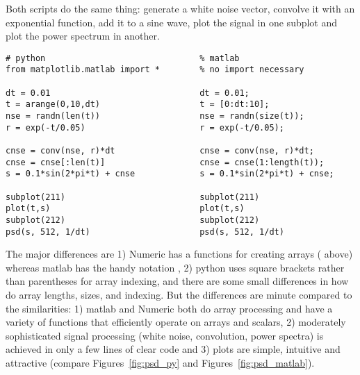 \documentclass[twoside]{book}
\begin{document}

Both scripts do the same thing: generate a white noise vector,
convolve it with an exponential function, add it to a sine wave, plot
the signal in one subplot and plot the power spectrum in another.

\begin{lstlisting}[caption={matplotlib and matlab}, label=lst:versus_matlab]
# python                               % matlab
from matplotlib.matlab import *        % no import necessary

dt = 0.01                              dt = 0.01;
t = arange(0,10,dt)                    t = [0:dt:10];
nse = randn(len(t))                    nse = randn(size(t));
r = exp(-t/0.05)                       r = exp(-t/0.05);

cnse = conv(nse, r)*dt                 cnse = conv(nse, r)*dt;
cnse = cnse[:len(t)]                   cnse = cnse(1:length(t));
s = 0.1*sin(2*pi*t) + cnse             s = 0.1*sin(2*pi*t) + cnse;

subplot(211)                           subplot(211)
plot(t,s)                              plot(t,s)
subplot(212)                           subplot(212)
psd(s, 512, 1/dt)                      psd(s, 512, 1/dt)
\end{lstlisting}

The major differences are 1) Numeric has a functions for creating
arrays ( above) whereas matlab has the handy notation
\code{[0:dt:10]}, 2) python uses square brackets rather than
parentheses for array indexing, and there are some small differences
in how do array lengths, sizes, and indexing.  But the differences are
minute compared to the similarities: 1) matlab and Numeric both do
array processing and have a variety of functions that efficiently
operate on arrays and scalars, 2) moderately sophisticated signal
processing (white noise, convolution, power spectra) is achieved in
only a few lines of clear code and 3) plots are simple, intuitive and
attractive (compare Figures~\ref{fig:psd_py} and
Figures~\ref{fig:psd_matlab}).


\end{document}
